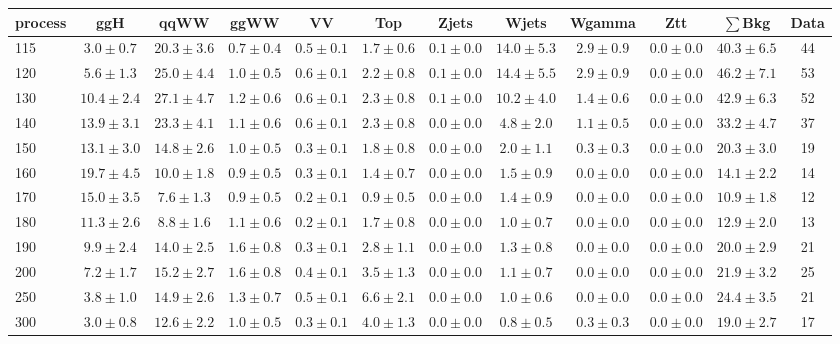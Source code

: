 \begin{table}[!hb]
{\footnotesize
 \begin{center}
 \begin{tabular}{l c c c c c c c c c c c }
 \hline
 process & ggH & qqWW & ggWW & VV & Top & Zjets & Wjets & Wgamma & Ztt & $\sum$Bkg & Data \\
 \hline
115 & $3.0\pm0.7$ & $20.3\pm3.6$ & $0.7\pm0.4$ & $0.5\pm0.1$ & $1.7\pm0.6$ & $0.1\pm0.0$ & $14.0\pm5.3$ & $2.9\pm0.9$ & $0.0\pm0.0$ & $40.3\pm6.5$ & 44 \\
120 & $5.6\pm1.3$ & $25.0\pm4.4$ & $1.0\pm0.5$ & $0.6\pm0.1$ & $2.2\pm0.8$ & $0.1\pm0.0$ & $14.4\pm5.5$ & $2.9\pm0.9$ & $0.0\pm0.0$ & $46.2\pm7.1$ & 53 \\
130 & $10.4\pm2.4$ & $27.1\pm4.7$ & $1.2\pm0.6$ & $0.6\pm0.1$ & $2.3\pm0.8$ & $0.1\pm0.0$ & $10.2\pm4.0$ & $1.4\pm0.6$ & $0.0\pm0.0$ & $42.9\pm6.3$ & 52 \\
140 & $13.9\pm3.1$ & $23.3\pm4.1$ & $1.1\pm0.6$ & $0.6\pm0.1$ & $2.3\pm0.8$ & $0.0\pm0.0$ & $4.8\pm2.0$ & $1.1\pm0.5$ & $0.0\pm0.0$ & $33.2\pm4.7$ & 37 \\
150 & $13.1\pm3.0$ & $14.8\pm2.6$ & $1.0\pm0.5$ & $0.3\pm0.1$ & $1.8\pm0.8$ & $0.0\pm0.0$ & $2.0\pm1.1$ & $0.3\pm0.3$ & $0.0\pm0.0$ & $20.3\pm3.0$ & 19 \\
160 & $19.7\pm4.5$ & $10.0\pm1.8$ & $0.9\pm0.5$ & $0.3\pm0.1$ & $1.4\pm0.7$ & $0.0\pm0.0$ & $1.5\pm0.9$ & $0.0\pm0.0$ & $0.0\pm0.0$ & $14.1\pm2.2$ & 14 \\
170 & $15.0\pm3.5$ & $7.6\pm1.3$ & $0.9\pm0.5$ & $0.2\pm0.1$ & $0.9\pm0.5$ & $0.0\pm0.0$ & $1.4\pm0.9$ & $0.0\pm0.0$ & $0.0\pm0.0$ & $10.9\pm1.8$ & 12 \\
180 & $11.3\pm2.6$ & $8.8\pm1.6$ & $1.1\pm0.6$ & $0.2\pm0.1$ & $1.7\pm0.8$ & $0.0\pm0.0$ & $1.0\pm0.7$ & $0.0\pm0.0$ & $0.0\pm0.0$ & $12.9\pm2.0$ & 13 \\
190 & $9.9\pm2.4$ & $14.0\pm2.5$ & $1.6\pm0.8$ & $0.3\pm0.1$ & $2.8\pm1.1$ & $0.0\pm0.0$ & $1.3\pm0.8$ & $0.0\pm0.0$ & $0.0\pm0.0$ & $20.0\pm2.9$ & 21 \\
200 & $7.2\pm1.7$ & $15.2\pm2.7$ & $1.6\pm0.8$ & $0.4\pm0.1$ & $3.5\pm1.3$ & $0.0\pm0.0$ & $1.1\pm0.7$ & $0.0\pm0.0$ & $0.0\pm0.0$ & $21.9\pm3.2$ & 25 \\
250 & $3.8\pm1.0$ & $14.9\pm2.6$ & $1.3\pm0.7$ & $0.5\pm0.1$ & $6.6\pm2.1$ & $0.0\pm0.0$ & $1.0\pm0.6$ & $0.0\pm0.0$ & $0.0\pm0.0$ & $24.4\pm3.5$ & 21 \\
300 & $3.0\pm0.8$ & $12.6\pm2.2$ & $1.0\pm0.5$ & $0.3\pm0.1$ & $4.0\pm1.3$ & $0.0\pm0.0$ & $0.8\pm0.5$ & $0.3\pm0.3$ & $0.0\pm0.0$ & $19.0\pm2.7$ & 17 \\

\end{tabular}
\end{center}}
\end{table}
